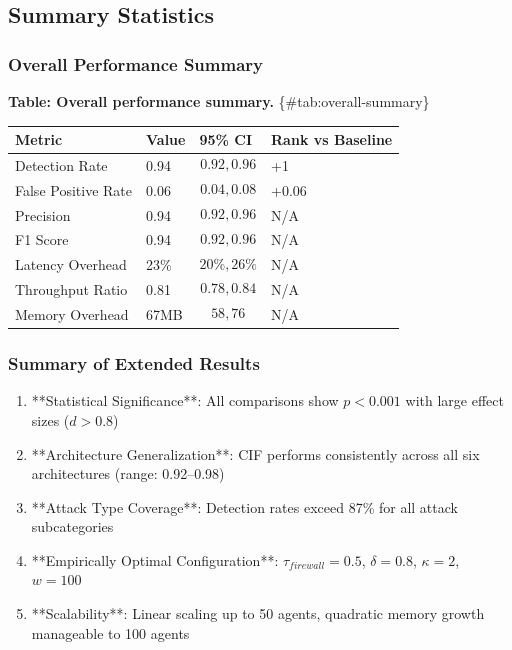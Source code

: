 \documentclass[
]{article}
\newcounter{none} %
\begin{document}
\subsection{Summary Statistics}\label{sec:summary-stats}

\subsubsection{Overall Performance Summary}\label{sec:overall-summary}

\textbf{Table: Overall performance summary.} \{\#tab:overall-summary\}

{\def\LTcaptype{none} %
\begin{longtable}[]{@{}llll@{}}
\toprule\noalign{}
Metric & Value & 95\% CI & Rank vs Baseline \\
\midrule\noalign{}
\endhead
\bottomrule\noalign{}
\endlastfoot
Detection Rate & 0.94 & \[0.92, 0.96\] & +1 \\
False Positive Rate & 0.06 & \[0.04, 0.08\] & +0.06 \\
Precision & 0.94 & \[0.92, 0.96\] & N/A \\
F1 Score & 0.94 & \[0.92, 0.96\] & N/A \\
Latency Overhead & 23\% & \[20\%, 26\%\] & N/A \\
Throughput Ratio & 0.81 & \[0.78, 0.84\] & N/A \\
Memory Overhead & 67MB & \[58, 76\] & N/A \\
\end{longtable}
}

\subsubsection{Summary of Extended
Results}\label{sec:extended-key-findings}

\begin{enumerate}
\item **Statistical Significance**: All comparisons show $p < 0.001$ with large effect sizes ($d > 0.8$)
\item **Architecture Generalization**: CIF performs consistently across all six architectures (range: 0.92--0.98)
\item **Attack Type Coverage**: Detection rates exceed 87\% for all attack subcategories
\item **Empirically Optimal Configuration**: $\tau_{firewall} = 0.5$, $\delta = 0.8$, $\kappa = 2$, $w = 100$
\item **Scalability**: Linear scaling up to 50 agents, quadratic memory growth manageable to 100 agents
\end{enumerate}
\end{document}
